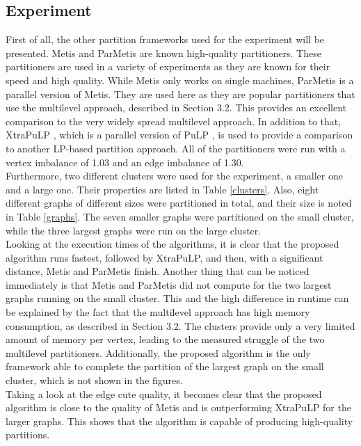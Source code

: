 \documentclass[acmsmall,nonacm,screen,review]{acmart}
\begin{document}
\subsection{Experiment}
First of all, the other partition frameworks used for the experiment will be presented. Metis \cite{Metis} and ParMetis \cite{ParMetis} are known high-quality partitioners. These partitioners are used in a variety of experiments as they are known for their speed and high quality. While Metis only works on single machines, ParMetis is a parallel version of Metis. They are used here as they are popular partitioners that use the multilevel approach, described in Section 3.2. This provides an excellent comparison to the very widely spread multilevel approach. In addition to that, XtraPuLP \cite{XtraPuLP}, which is a parallel version of PuLP \cite{PuLP}, is used to provide a comparison to another LP-based partition approach. All of the partitioners were run with a vertex imbalance of 1.03 and an edge imbalance of 1.30. \\
Furthermore, two different clusters were used for the experiment, a smaller one and a large one. Their properties are listed in Table \ref{clusters}. Also, eight different graphs of different sizes were partitioned in total, and their size is noted in Table \ref{graphs}. The seven smaller graphs were partitioned on the small cluster, while the three largest graphs were run on the large cluster. \\
Looking at the execution times of the algorithms, it is clear that the proposed algorithm runs fastest, followed by XtraPuLP, and then, with a significant distance, Metis and ParMetis finish. Another thing that can be noticed immediately is that Metis and ParMetis did not compute for the two largest graphs running on the small cluster. This and the high difference in runtime can be explained by the fact that the multilevel approach has high memory consumption, as described in Section 3.2. The clusters provide only a very limited amount of memory per vertex, leading to the measured struggle of the two multilevel partitioners. Additionally, the proposed algorithm is the only framework able to complete the partition of the largest graph on the small cluster, which is not shown in the figures. \\
Taking a look at the edge cute quality, it becomes clear that the proposed algorithm is close to the quality of Metis and is outperforming XtraPuLP for the larger graphs. This shows that the algorithm is capable of producing high-quality partitions. \\
\end{document}

